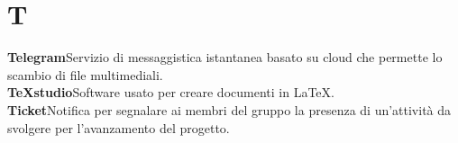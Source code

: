 \newpage
\section{T}\label{l:T}

\textbf{Telegram}\newline Servizio di messaggistica istantanea basato su cloud che permette lo scambio di file multimediali.\\
\newline
\textbf{TeXstudio}\newline Software usato per creare documenti in \LaTeX.\\
\newline
\textbf{Ticket}\newline Notifica per segnalare ai membri del gruppo la presenza di un'attività da svolgere per l'avanzamento del progetto.
